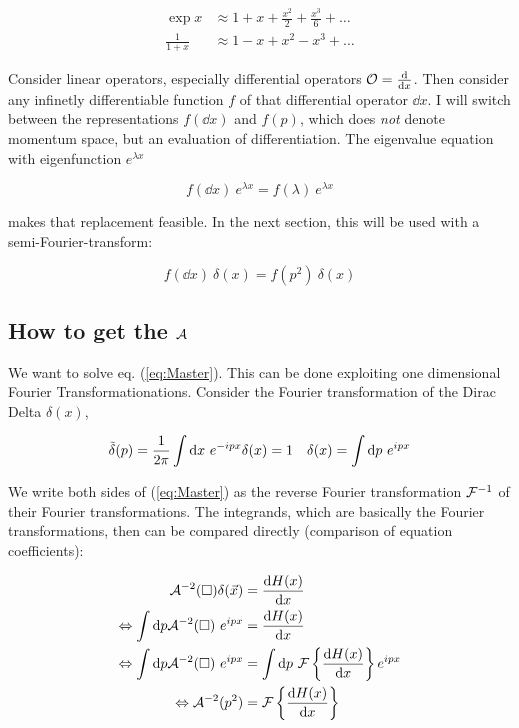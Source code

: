 \documentclass[10pt,a4paper, fleqn]{article}
\begin{document}
\begin{align}
\exp x &\approx 1 + x + \frac {x^2}2 + \frac {x^3}6 + \dots \\
\frac 1{1+x} &\approx 1 - x + x^2 - x^3 + \dots
\end{align}

Consider linear operators, especially differential operators ${\cal O} = \frac{\mathrm{d} }{\mathrm{d} x}$. Then consider any infinetly differentiable function $f$ of that differential operator $\dd{}x$. I will switch between the representations $f(\dd{}x)$ and $f(p)$, which does {\it not} denote momentum space, but an evaluation of differentiation. The eigenvalue equation with eigenfunction $e^{\lambda x}$

\begin{equation}
f\left(\dd{}x\right) ~ e^{\lambda x} = f(\lambda) ~ e^{\lambda x}
\end{equation}

makes that replacement feasible. In the next section, this will be used with a semi-Fourier-transform:

\begin{equation}
f\left(\dd{}x\right) ~ \delta(x) = f(p^2) ~ \delta(x)
\end{equation}


\subsection{How to get the ${\cal A}$}
We want to solve eq. (\ref{eq:Master}). This can be done exploiting one dimensional Fourier Transformationations. Consider the Fourier transformation of the Dirac Delta $\delta(x)$,

\begin{align}
&\tilde \delta(p) = \frac 1{2\pi} \int \mathrm{d} x~e^{-ipx} \delta(x) = 1
&\delta(x) = \int \mathrm{d} p~e^{ipx}  \label{eq:Fdelta}
\end{align}

We write both sides of (\ref{eq:Master}) as the reverse Fourier transformation ${\cal F}^{-1}$ of their Fourier transformations. The integrands, which are basically the Fourier transformations, then can be compared directly (comparison of equation coefficients):

\begin{align}
{\cal A}^{-2}(\square)\delta(\vec x) &= \frac{\mathrm{d} H(x)}{\mathrm{d} x} \\
\Leftrightarrow  \int \mathrm{d} p {\cal A}^{-2}(\square)~e^{ipx} &= \frac{\mathrm{d} H(x)}{\mathrm{d} x}
\label{eq:U1}
\\
\Leftrightarrow \int \mathrm{d} p {\cal A}^{-2}(\square)~e^{ipx} &= \int \mathrm{d} p~ {\cal F} \left\{ \frac{\mathrm{d} H(x)}{\mathrm{d} x} \right\}  e^{ipx} 
\\
\Leftrightarrow  {\cal A}^{-2}(p^2) &=  {\cal F} \left\{ \frac{\mathrm{d} H(x)}{\mathrm{d} x} \right\}
\end{align}
\end{document}
